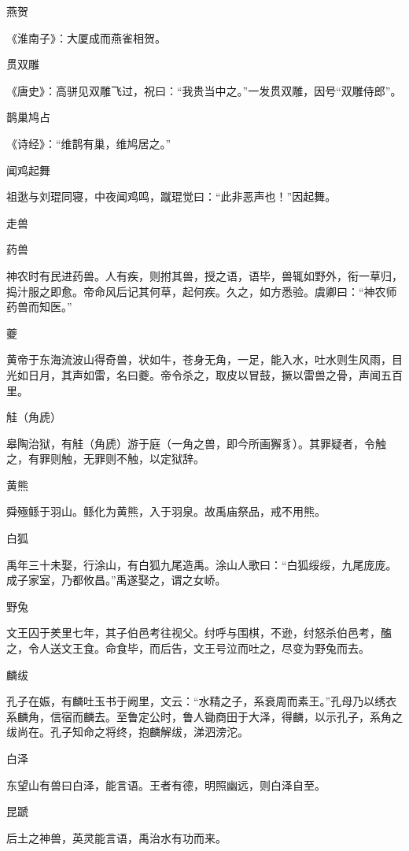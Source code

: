 \documentclass[a4paper,12pt,UTF8,twoside]{ctexbook}
\begin{document}
    燕贺
    
    《淮南子》：大厦成而燕雀相贺。
    
    贯双雕
    
    《唐史》：高骈见双雕飞过，祝曰：“我贵当中之。”一发贯双雕，因号“双雕侍郎”。
    
    鹊巢鸠占
    
    《诗经》：“维鹊有巢，维鸠居之。”
    
    闻鸡起舞
    
    祖逖与刘琨同寝，中夜闻鸡鸣，蹴琨觉曰：“此非恶声也！”因起舞。
    
    走兽
    
    药兽
    
    神农时有民进药兽。人有疾，则拊其兽，授之语，语毕，兽辄如野外，衔一草归，捣汁服之即愈。帝命风后记其何草，起何疾。久之，如方悉验。虞卿曰：“神农师药兽而知医。”
    
    夔
    
    黄帝于东海流波山得奇兽，状如牛，苍身无角，一足，能入水，吐水则生风雨，目光如日月，其声如雷，名曰夔。帝令杀之，取皮以冒鼓，撅以雷兽之骨，声闻五百里。
    
    觟（角虒）
    
    皋陶治狱，有觟（角虒）游于庭（一角之兽，即今所画獬豸）。其罪疑者，令触之，有罪则触，无罪则不触，以定狱辞。
    
    黄熊
    
    舜殛鲧于羽山。鲧化为黄熊，入于羽泉。故禹庙祭品，戒不用熊。
    
    白狐
    
    禹年三十未娶，行涂山，有白狐九尾造禹。涂山人歌曰：“白狐绥绥，九尾庞庞。成子家室，乃都攸昌。”禹遂娶之，谓之女峤。
    
    野兔
    
    文王囚于羑里七年，其子伯邑考往视父。纣呼与围棋，不逊，纣怒杀伯邑考，醢之，令人送文王食。命食毕，而后告，文王号泣而吐之，尽变为野兔而去。
    
    麟绂
    
    孔子在娠，有麟吐玉书于阙里，文云：“水精之子，系衰周而素王。”孔母乃以绣衣系麟角，信宿而麟去。至鲁定公时，鲁人锄商田于大泽，得麟，以示孔子，系角之绂尚在。孔子知命之将终，抱麟解绂，涕泗滂沱。
    
    白泽
    
    东望山有兽曰白泽，能言语。王者有德，明照幽远，则白泽自至。
    
    昆蹏
    
    后土之神兽，英灵能言语，禹治水有功而来。
    
\end{document}
